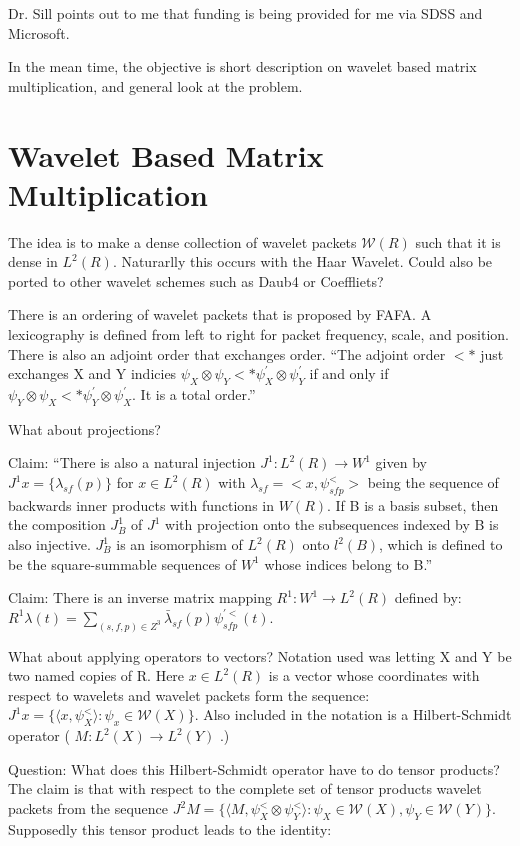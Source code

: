 \documentclass[11pt]{book}
\begin{document}
Dr. Sill points out to me that funding is being provided for me via SDSS and Microsoft.  

In the mean time, the objective is short description on wavelet based matrix multiplication, and general look at the problem.  

\chapter{Wavelet Based Matrix Multiplication}
The idea is to make a dense collection of wavelet packets $\mathcal{W}(R)$ such that it is dense in $L^2(R)$.  Naturarlly this occurs with the Haar Wavelet.  Could also be ported to other wavelet schemes such as Daub4 or Coeffliets?

There is an ordering of wavelet packets that is proposed by FAFA.  A lexicography is defined from left to right for packet frequency, scale, and position.  There is also an adjoint order that exchanges order.  ``The adjoint order $<*$ just exchanges X and Y indicies $\psi_X \otimes \psi_Y <* \psi^\prime_X \otimes \psi^\prime_Y$ if and only if $\psi_Y \otimes \psi_X <* \psi^\prime_Y \otimes \psi^\prime_X$.  It is a total order.''

What about projections?  

Claim:
``There is also a natural injection $J^1:L^2(R) \to W^1$ given by $J^1x=\{\lambda_{sf} (p)\}$ for $x \in L^2(R)$ with $\lambda_{sf} = <x,\psi^<_{sfp}>$ being the sequence of backwards inner products with functions in $W(R)$.  If B is a basis subset, then the composition $J^1_B$ of $J^1$ with projection onto the subsequences indexed by B is also injective.  $J^1_B$ is an isomorphism of $L^2(R)$ onto $l^2(B)$, which is defined to be the square-summable sequences of $W^1$ whose indices belong to B.''


Claim: There is an inverse matrix mapping  $R^1:W^1\to L^2(R)$ defined by:
$R^1\lambda(t) = \sum\limits_{(s,f,p)\in Z^3} \bar{\lambda}_{sf}(p)\psi^{\prime <}_{sfp}(t)$.

What about applying operators to vectors?
Notation used was letting X and Y be two named copies of R.  Here $x\in L^2(R)$ is a vector whose coordinates with respect to wavelets and wavelet packets form the sequence: $J^1x = \{ \langle x, \psi^<_X\rangle : \psi_x \in \mathcal{W}(X)\} $.  Also included in the notation is a Hilbert-Schmidt operator ( $M:L^2(X)\to L^2(Y)$ .) 

Question: What does this Hilbert-Schmidt operator have to do tensor products?  The claim is that with respect to the complete set of tensor products wavelet packets from the sequence $J^2M = \{\langle M, \psi^<_X \otimes \psi ^<_Y\rangle : \psi_X\in \mathcal{W}(X), \psi _Y \in \mathcal{W}(Y) \}$.  Supposedly this tensor product leads to the identity:
\end{document}

